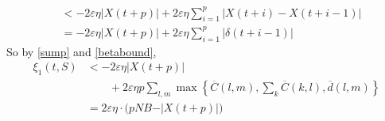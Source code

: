 \begin{IEEEproof}
\begin{align}
&< -2\varepsilon \eta   \vert X(t + p) \vert  + 2\varepsilon \eta\sum_{i=1}^{p} \vert  X(t + i) - X(t + i - 1)   \vert  \\ 
&= -2\varepsilon \eta   \vert X(t + p) \vert + 2\varepsilon \eta\sum_{i=1}^{p} \vert \delta(t + i -1) \vert 
\label{sump}
\end{align}
So by \eqref{sump} and \eqref{betabound}, 
\begin{align} \nonumber
\xi_1(t, S) &< -2\varepsilon \eta  \vert X(t + p) \vert \\ \nonumber
& \qquad + 2\varepsilon \eta  p \sum_{l,m} \max\left\{ \overline{C}(l,m),\sum_{k}\overline{C}(k,l),\overline d(l,m) \right\} \\ 
& = 2 \varepsilon \eta \cdot  \Big(pNB -  \vert X(t + p) \vert\Big) \label{xi1_bound}
\end{align}
%
%
%

\end{IEEEproof}
